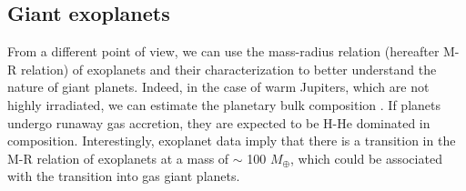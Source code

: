 \documentclass{aa}
\begin{document}
\subsection{Giant exoplanets}
From a different point of view, we can use the mass-radius relation (hereafter M-R relation) of exoplanets and their characterization to better understand the nature of giant planets. 
Indeed, in the case of warm Jupiters, which are not highly irradiated, we can estimate the planetary bulk composition \citep[e.g.,][and references therein]{Thorngren2016,2019ApJ...874L..31T,2023A&A...669A..24M}. 
If planets undergo runaway gas accretion, they are expected to be H-He dominated in composition.  
 Interestingly, exoplanet data imply that there is a transition in the M-R relation of exoplanets at a mass of $\sim$ 100 $M_{\oplus}$, which could be associated with the transition into gas giant planets. 
\end{document}
